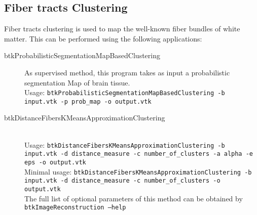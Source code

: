 \subsection{Fiber tracts Clustering}
\label{subsec:clustering}

Fiber tracts clustering is used to map the well-known fiber bundles of white matter.
This can be performed using the following applications:

\begin{description}
        \item[btkProbabilisticSegmentationMapBasedClustering] As supervised method, this program takes as input a probabilistic segmentation Map of brain tissue.\\ 

	Usage: \texttt{btkProbabilisticSegmentationMapBasedClustering -b input.vtk -p prob\_map -o output.vtk}
 
	\item[btkDistanceFibersKMeansApproximationClustering] ~\\

	Usage: \texttt{btkDistanceFibersKMeansApproximationClustering -b input.vtk -d distance\_measure -c number\_of\_clusters -a alpha -e eps -o output.vtk} \\

	Minimal usage: \texttt{btkDistanceFibersKMeansApproximationClustering -b input.vtk -d distance\_measure -c number\_of\_clusters -o output.vtk} \\

	The full list of optional parameters of this method can be obtained by \texttt{btkImageReconstruction --help}
\end{description}

